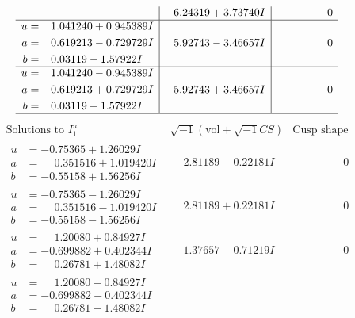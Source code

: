 \documentclass[1p]{elsarticle_modified}
\theoremstyle{definition}
\newcommand{\I}{\sqrt{-1}}
\begin{document}
$$\begin{array}{c|c|c}
 & \phantom{-}6.24319 + 3.73740 I & \phantom{-0.000000 } 0 \\ \hline\begin{aligned}
u &= \phantom{-}1.041240 + 0.945389 I \\
a &= \phantom{-}0.619213 - 0.729729 I \\
b &= \phantom{-}0.03119 - 1.57922 I\end{aligned}
 & \phantom{-}5.92743 - 3.46657 I & \phantom{-0.000000 } 0 \\ \hline\begin{aligned}
u &= \phantom{-}1.041240 - 0.945389 I \\
a &= \phantom{-}0.619213 + 0.729729 I \\
b &= \phantom{-}0.03119 + 1.57922 I\end{aligned}
 & \phantom{-}5.92743 + 3.46657 I & \phantom{-0.000000 } 0\\
 \hline 
 \end{array}$$\newpage$$\begin{array}{c|c|c}  
\text{Solutions to }I^u_{1}& \I (\text{vol} + \sqrt{-1}CS) & \text{Cusp shape}\\
 \hline 
\begin{aligned}
u &= -0.75365 + 1.26029 I \\
a &= \phantom{-}0.351516 + 1.019420 I \\
b &= -0.55158 + 1.56256 I\end{aligned}
 & \phantom{-}2.81189 - 0.22181 I & \phantom{-0.000000 } 0 \\ \hline\begin{aligned}
u &= -0.75365 - 1.26029 I \\
a &= \phantom{-}0.351516 - 1.019420 I \\
b &= -0.55158 - 1.56256 I\end{aligned}
 & \phantom{-}2.81189 + 0.22181 I & \phantom{-0.000000 } 0 \\ \hline\begin{aligned}
u &= \phantom{-}1.20080 + 0.84927 I \\
a &= -0.699882 + 0.402344 I \\
b &= \phantom{-}0.26781 + 1.48082 I\end{aligned}
 & \phantom{-}1.37657 - 0.71219 I & \phantom{-0.000000 } 0 \\ \hline\begin{aligned}
u &= \phantom{-}1.20080 - 0.84927 I \\
a &= -0.699882 - 0.402344 I \\
b &= \phantom{-}0.26781 - 1.48082 I\end{aligned}

\end{array}$$
\end{document}
